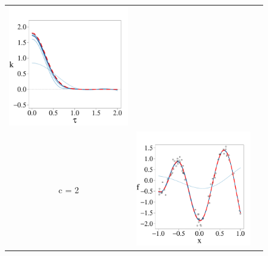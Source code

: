 \documentclass[onecolumn,a4paper,11pt]{article}
\begin{document}
\begin{figure}
\begin{tabular}{ c c c }
\includegraphics[scale=0.215, trim = 0mm 14mm 5mm 14mm, clip]{ch5_fig3_Cov_part4.pdf} & \\
\cline{1-2}
c = 2 &
\includegraphics[scale=0.215, trim = 0mm 14mm 0mm 14mm, clip]{ch5_fig3_Post_part5.pdf} 

\end{tabular}
\end{figure}
\end{document}
